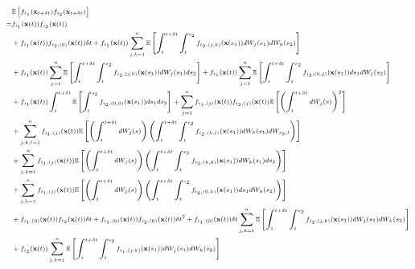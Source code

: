 \begin{equation} \label{eq:E12}
\scriptsize
\begin{aligned}
&\mathbb{E} \left[ f_{i_1}(\mathbf{x}_{t + \delta t}) f_{i_2}(\mathbf{x}_{t + \delta t}) \right] \\
=& 
f_{i_1}(\mathbf{x}(t)) f_{i_2}(\mathbf{x}(t)) \\
&+  f_{i_1}(\mathbf{x}(t)) f_{{i_2},(0)}(\mathbf{x}(t)) \delta t
+ f_{i_1}(\mathbf{x}(t)) \sum_{j, k=1}^n \mathbb{E} \left[ \int_t^{t+\delta t} \int_t^{s_2} f_{{i_2}, (j,k)}(\mathbf{x}(s_1)) dW_j(s_1) dW_k(s_2) \right] \\
&+ f_{i_1}(\mathbf{x}(t)) \sum_{j=1}^n \mathbb{E}  \left[ \int_t^{t+\delta t} \int_t^{s_2} f_{{i_2}, (j,0)}(\mathbf{x}(s_1)) dW_j(s_1) ds_2 \right] 
+ f_{i_1}(\mathbf{x}(t)) \sum_{j=1}^n \mathbb{E} \left[ \int_t^{t+\delta t} \int_t^{s_2} f_{{i_2}, (0,j)}(\mathbf{x}(s_1)) ds_1 dW_j(s_2) \right] \\
&+ f_{i_1}(\mathbf{x}(t)) \int_t^{t+\delta t} \mathbb{E} \left[ \int_t^{s_2} f_{{i_2}, (0,0)}(\mathbf{x}(s_1)) ds_1 ds_2 \right]
+  \sum_{j=1}^n f_{{i_1},(j)}(\mathbf{x}(t)) f_{{i_2},(j)}(\mathbf{x}(t)) \mathbb{E} \left[ \left( \int_t^{t + \delta t} dW_j(s) \right)^2 \right] \\
&+ \sum_{j,k,l=1}^n f_{{i_1},(j)}(\mathbf{x}(t)) \mathbb{E} \left[ \left( \int_t^{t + \delta t} dW_j(s) \right) \left( \int_t^{t+\delta t} \int_t^{s_2} f_{{i_2},(k,l)}(\mathbf{x}(s_1)) dW_k(s_1) dW_{s_2, l} \right) \right] \\
&+ \sum_{j,k=1}^n f_{{i_1},(j)}(\mathbf{x}(t)) \mathbb{E} \left[ \left( \int_t^{t + \delta t} dW_j(s) \right)\left( \int_t^{t+\delta t} \int_t^{s_2} f_{{i_2},(k,0)}(\mathbf{x}(s_1)) dW_k(s_1) ds_2 \right) \right]\\
&+ \sum_{j, k=1}^n f_{{i_1},(j)}(\mathbf{x}(t)) \mathbb{E} \left[ \left( \int_t^{t + \delta t} dW_j(s) \right) \left( \int_t^{t+\delta t} \int_t^{s_2} f_{{i_2},(0,k)}(\mathbf{x}(s_1)) ds_1 dW_k(s_2) \right) \right] \\
&+f_{{i_1},(0)}(\mathbf{x}(t)) f_{i_2}(\mathbf{x}(t)) \delta t
+  f_{{i_1},(0)}(\mathbf{x}(t))f_{{i_2},(0)}(\mathbf{x}(t)) \delta t^2
+  f_{{i_1},(0)}(\mathbf{x}(t)) \delta t \sum_{j, k=1}^n \mathbb{E} \left[ \int_t^{t+\delta t} \int_t^{s_2} f_{{i_2},(j,k)}(\mathbf{x}(s_1)) dW_j(s_1) dW_k(s_2) \right] \\
&+f_{i_2}(\mathbf{x}(t)) \sum_{j, k=1}^n \mathbb{E} \left[ \int_t^{t+\delta t} \int_t^{s_2} f_{{i_1},(j,k)}(\mathbf{x}(s_1)) dW_j(s_1) dW_k(s_2) \right] \\

\end{aligned}
\end{equation}
